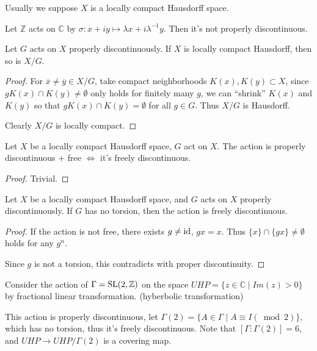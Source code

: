 Usually we suppose $X$ is a locally compact Hausdorff space.

\begin{example}
    Let $\mathbb{Z}$ acts on $\mathbb{C}$ by $\sigma: x+iy \mapsto\lambda x+i\lambda^{-1}y$.
	Then it's not properly discontinuous.
\end{example}
\begin{proposition}
	Let $G$ acts on $X$ properly discontinuously.
	If $X$ is locally compact Hausdorff, then so is $X / G$.
\end{proposition}
\begin{proof}[Proof]
    For $\overline{x} \ne \overline{y}\in X / G$,
	take compact neighborhoods $K(x), K(y) \subset X$,
	since $gK(x) \cap K(y) \ne \emptyset$ only holds for finitely many $g$,
	we can ``shrink'' $K(x)$ and $K(y)$ so that $gK(x)\cap K(y) = \emptyset$ for
	all $g\in G$.
	Thus $X / G$ is Hausdorff.

	Clearly $X / G$ is locally compact.
\end{proof}

\begin{proposition}
	Let $X$ be a locally compact Hausdorff space, $G$ act on $X$.
	The action is properly discontinuous + free $\iff$ it's freely discontinuous.
\end{proposition}
\begin{proof}[Proof]
    Trivial.
\end{proof}

\begin{corollary}
    Let $X$ be a locally compact Hausdorff space,
	and $G$ acts on $X$ properly discontinuously.
	If $G$ has no torsion, then the action is freely discontinuous.
\end{corollary}
\begin{proof}[Proof]
    If the action is not free, there exists $g\ne \operatorname{id}$,  $gx = x$.
	Thus $\{x\}\cap \{gx\} \ne \emptyset$ holds for any $g^n$.

	Since $g$ is not a torsion, this contradicts with proper discontinuity.
\end{proof}

\begin{example}
    Consider the action of $\Gamma = \mathrm{SL}(2, \mathbb{Z})$ on the
	space $UHP = \{z\in \mathbb{C}\mid Im(z) > 0\}$ by fractional linear transformation.
	(hyberbolic transformation)

	This action is properly discontinuous, let  $\Gamma(2) = \{A\in \Gamma \mid
	A\equiv I (\bmod 2)\}$, which has no torsion, thus it's freely discontinuous.
	Note that $[\Gamma:\Gamma(2)] = 6$, and $UHP \to UHP / \Gamma(2)$ is a
	covering map.
\end{example}
